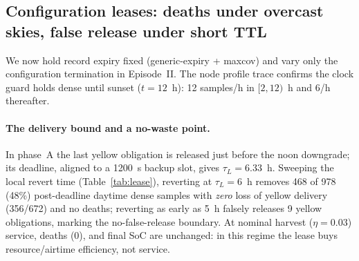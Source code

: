 \documentclass[11pt]{article}
\begin{document}
\subsection{Configuration leases: deaths under overcast skies, false release under short TTL}
\label{sec:eval-lease}
We now hold record expiry fixed (generic-expiry + maxcov) and vary only the configuration
termination in Episode~II. The node profile trace confirms the clock guard holds dense until
sunset ($t{=}12$~h): 12 samples/h in $[2,12)$~h and 6/h thereafter.

\paragraph{The delivery bound and a no-waste point.}
In phase~A the last yellow obligation is released just before the noon downgrade; its deadline,
aligned to a 1200~s backup slot, gives $\tau_L{=}6.33$~h. Sweeping the local revert time
(Table~\ref{tab:lease}), reverting at $\tau_L{=}6$~h removes 468 of 978 (48\%) post-deadline daytime
dense samples with \emph{zero} loss of yellow delivery (356/672) and no deaths; reverting as early
as 5~h falsely releases 9 yellow obligations, marking the no-false-release boundary. At nominal
harvest ($\eta{=}0.03$) service, deaths (0), and final SoC are unchanged: in this regime the lease
buys resource/airtime efficiency, not service.
\end{document}
